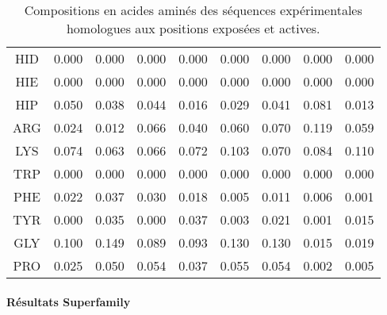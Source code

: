 \begin{table}[!htbp]
\begin{tabular}{ccccccccc}
        \cmidrule{1-9}
   HID  & 0.000  &  0.000  &   0.000  &   0.000  &   0.000 &   0.000  &   0.000  &   0.000 \\                                         
   HIE  & 0.000  &  0.000  &   0.000  &   0.000  &   0.000 &   0.000  &   0.000  &   0.000 \\                                         
   HIP  & 0.050  &  0.038  &   0.044  &   0.016  &   0.029 &   0.041  &   0.081  &   0.013 \\                                        
        \cmidrule{1-9}
   ARG  & 0.024  &  0.012  &   0.066  &   0.040  &   0.060 &   0.070  &   0.119  &   0.059 \\                                          
        \cmidrule{1-9}
   LYS  & 0.074  &  0.063  &   0.066  &   0.072  &   0.103 &   0.070  &   0.084  &   0.110 \\                                          
        \cmidrule{1-9}
   TRP  & 0.000  &  0.000  &   0.000  &   0.000  &   0.000 &   0.000  &   0.000  &   0.000 \\                                         
        \cmidrule{1-9}
   PHE  & 0.022  &  0.037  &   0.030  &   0.018  &   0.005 &   0.011  &   0.006  &   0.001 \\                                         
        \cmidrule{1-9}
   TYR  & 0.000  &  0.035  &   0.000  &   0.037  &   0.003 &   0.021  &   0.001  &   0.015 \\
        \cmidrule{1-9}
   GLY  & 0.100  &  0.149  &   0.089  &   0.093  &   0.130 &   0.130  &   0.015  &   0.019 \\                                            
   PRO  & 0.025  &  0.050  &   0.054  &   0.037  &   0.055 &   0.054  &   0.002  &   0.005 \\                                         
        \bottomrule


      \end{tabular}      
      \caption{Compositions en acides aminés des séquences expérimentales homologues aux positions exposées et actives.}
\label{tab:freq_AA_ALL}      
    \end{table}


    \clearpage
   \paragraph{Résultats Superfamily}



